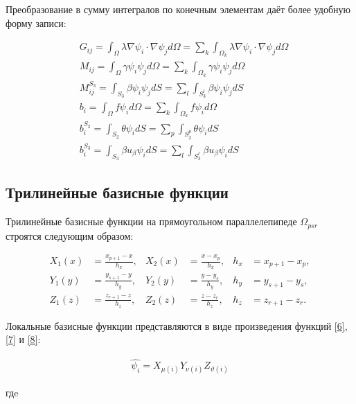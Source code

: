 \documentclass[12pt, a4paper]{article}
\begin{document}
\vspace{3mm}
\noindent Преобразование в сумму интегралов по конечным элементам даёт более удобную форму записи:

\begin{align}
  &G_{ij} = \int_{\Omega}\lambda\nabla{\psi_i}\cdot\nabla{\psi_j}d\Omega =
            \sum_{k}\int_{\Omega_k}\lambda\nabla{\psi_i}\cdot\nabla{\psi_j}d\Omega \\
  &M_{ij} = \int_{\Omega}\gamma \psi_i \psi_j d\Omega =
            \sum_{k}\int_{\Omega_k}\gamma \psi_i \psi_j d\Omega \\
  &M_{ij}^{S_3} = \int_{S_3}\beta \psi_i \psi_j dS =
                  \sum_{l}\int_{S_3^l}\beta \psi_i \psi_j dS \\
  &b_{i} = \int_{\Omega}f\psi_{i}d\Omega = 
           \sum_{k}\int_{\Omega_k}f\psi_{i}d\Omega \\
  \label{4} &b_{i}^{S_2} = \int_{S_2}\theta\psi_{i}dS = 
                            \sum_{p}\int_{S_2^p}\theta\psi_{i}dS \\
  \label{5} &b_{i}^{S_3} = \int_{S_3}\beta u_{\beta} \psi_{i}dS = 
                            \sum_{l}\int_{S_3^l}\beta u_{\beta}\psi_{i}dS
\end{align}

\subsection{Трилинейные базисные функции}

Трилинейные базисные функции на прямоугольном параллелепипеде $\Omega_{psr}$ строятся следующим образом:

\begin{align}
  \label{6} X_1(x) &= \frac{x_{p+1} - x}{h_x}, & X_2(x) &= \frac{x-x_p}{h_x}, & h_x &= x_{p+1}-x_p, \\
  \label{7} Y_1(y) &= \frac{y_{s+1} - y}{h_y}, & Y_2(y) &= \frac{y-y_s}{h_y}, & h_y &= y_{s+1}-y_s, \\
  \label{8} Z_1(z) &= \frac{z_{r+1} - z}{h_z}, & Z_2(z) &= \frac{z-z_r}{h_z}, & h_z &= z_{r+1}-z_r.
\end{align}

\noindent Локальные базисные функции представляются в виде произведения функций \ref{6}, \ref{7} и \ref{8}:

\begin{align}
  \label{9} \hat{\psi_i} = X_{\mu(i)}Y_{\nu(i)}Z_{\vartheta(i)}
\end{align}

\noindent гдe
\end{document}
